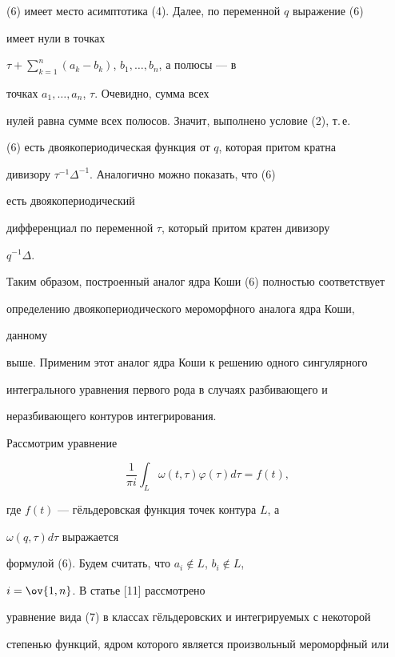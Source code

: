 (6) имеет место асимптотика (4). Далее, по переменной $q$ выражение (6) 


имеет нули в точках 


$\tau+\sum\limits^n_{k=1}(a_k-b_k)$, $b_1,\dotsc,b_n$, а полюсы --- в 


точках $a_1,\dotsc,a_n$, $\tau$. Очевидно, сумма всех 


нулей равна сумме всех полюсов. Значит, выполнено условие (2), т.\,е. 


(6) есть двоякопериодическая функция от $q$, которая притом кратна 


дивизору $\tau^{-1}\Delta^{-1}$. Аналогично можно показать, что (6) 


есть двоякопериодический 


дифференциал по переменной $\tau$, который притом кратен дивизору 


$q^{-1}\Delta$. 


 


Таким образом, построенный аналог ядра Коши (6) полностью соответствует 


определению двоякопериодического мероморфного аналога ядра Коши, 


данному 


выше. Применим этот аналог ядра Коши к решению одного сингулярного 


интегрального уравнения первого рода в случаях разбивающего и 


неразбивающего контуров интегрирования. 


 


Рассмотрим уравнение


\begin{equation} 


\frac{1}{\pi i}\int_L \omega(t,\tau)\varphi(\tau)d\tau=f(t), 


\end{equation} 


где $f(t)$ --- г\"ельдеровская функция точек контура $L$, а 


$\omega(q,\tau)d\tau$ выражается 


формулой (6). Будем считать, что $a_i\notin L$, $b_i\notin L$, 


$i=\ov{1,n}$. В статье [11] рассмотрено 


уравнение вида (7) в классах г\"ельдеровских и интегрируемых с некоторой 


степенью функций, ядром которого является произвольный мероморфный или 


